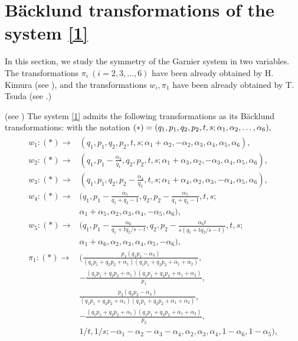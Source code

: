 \section{B{\"a}cklund transformations of the system \eqref{1}}
In this section, we study the symmetry of the Garnier system in two variables. The transformations $\pi_i \ (i=2,3,\dots,6)$ have been already obtained by H. Kimura (see \cite{K}), and the transformations $w_i,\pi_1$ have been already obtained by T. Tsuda (see \cite{Tsuda1,Tsuda2,Tsuda3,Tsuda4}.)
\begin{thm}\label{th:in1}\rm{(see \cite{K,Tsuda1,Tsuda2,Tsuda3,Tsuda4})\rm}
The system \eqref{1} admits the following transformations as its B{\"a}cklund transformations\rm{:\rm} with the notation $(*)=(q_1,p_1,q_2,p_2,t,\\
s;\alpha_1,\alpha_2,\dots,\alpha_6),$
\begin{align}\label{SG}
\begin{split}
        w_1: (*) \rightarrow& (q_1,p_1,q_2,p_2,t,s;\alpha_1+\alpha_2,-\alpha_2,\alpha_3,\alpha_4,\alpha_5,\alpha_6),\\
        w_2: (*) \rightarrow& (q_1,p_1-\frac{\alpha_3}{q_1},q_2,p_2,t,s;\alpha_1+\alpha_3,\alpha_2,-\alpha_3,\alpha_4,\alpha_5,\alpha_6),\\
        w_3: (*) \rightarrow& (q_1,p_1,q_2,p_2-\frac{\alpha_4}{q_2},t,s;\alpha_1+\alpha_4,\alpha_2,\alpha_3,-\alpha_4,\alpha_5,\alpha_6),\\
        w_4: (*) \rightarrow& (q_1,p_1-\frac{\alpha_5}{q_1+q_2-1},q_2,p_2-\frac{\alpha_5}{q_1+q_2-1},t,s;\\
        &\alpha_1+\alpha_5,\alpha_2,\alpha_3,\alpha_4,-\alpha_5,\alpha_6),\\
        w_5: (*) \rightarrow& (q_1,p_1-\frac{\alpha_6}{q_1+tq_2/s-t},q_2,p_2-\frac{\alpha_6t}{s(q_1+tq_2/s-t)},t,s;\\
        &\alpha_1+\alpha_6,\alpha_2,\alpha_3,\alpha_4,\alpha_5,-\alpha_6),\\
        \pi_1:(*) \rightarrow& (\frac{p_1(q_1p_1-\alpha_3)}{(q_1p_1+q_2p_2+\alpha_1)(q_1p_1+q_2p_2+\alpha_1+\alpha_2)},\\
        &-\frac{(q_1p_1+q_2p_2+\alpha_1)(q_1p_1+q_2p_2+\alpha_1+\alpha_2)}{p_1},\\
        &\frac{p_2(q_2p_2-\alpha_4)}{(q_1p_1+q_2p_2+\alpha_1)(q_1p_1+q_2p_2+\alpha_1+\alpha_2)},\\
        &-\frac{(q_1p_1+q_2p_2+\alpha_1)(q_1p_1+q_2p_2+\alpha_1+\alpha_2)}{p_2},\\
        &1/t,1/s;-\alpha_1-\alpha_2-\alpha_3-\alpha_4,\alpha_2,\alpha_3,\alpha_4,1-\alpha_6,1-\alpha_5),\\

\end{split}
\end{align}
\end{thm}
